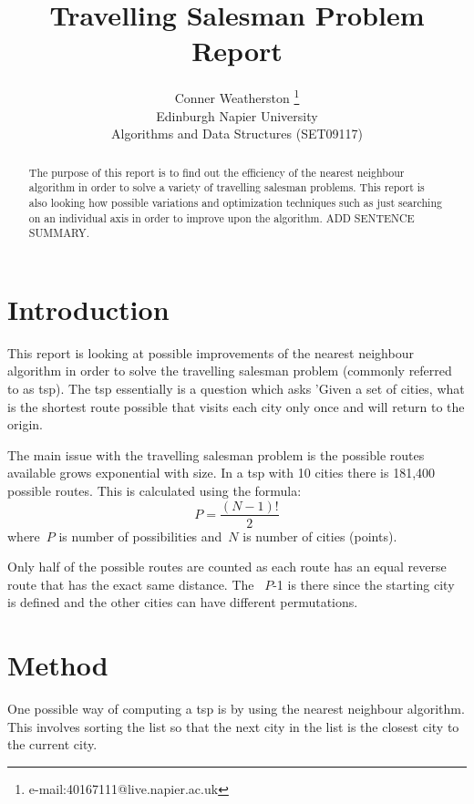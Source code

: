 \documentclass[conference,backref=page]{acmsiggraph}
\title{Travelling Salesman Problem\\
	   Report}
\author{Conner Weatherston \thanks{e-mail:40167111@live.napier.ac.uk} \\
Edinburgh Napier University\\
Algorithms and Data Structures (SET09117)}
\begin{document}
\maketitle

\raggedbottom

\begin{abstract}

The purpose of this report is to find out the efficiency of the nearest neighbour algorithm in order to solve a  variety of travelling salesman problems. This report is also looking how possible variations and optimization techniques such as just searching on an individual axis in order to improve upon the algorithm. ADD SENTENCE SUMMARY. 
\end{abstract}



\keywordlist


\section{Introduction}

This report is looking at possible improvements of the nearest neighbour algorithm in order to solve the travelling salesman problem (commonly referred to as tsp). The tsp essentially is a question which asks 'Given a set of cities, what is the shortest route possible that visits each city only once and will return to the origin\cite{tsp}.

The main issue with the travelling salesman problem is the possible routes available grows exponential with size. In a tsp with 10 cities there is 181,400 possible routes. This is calculated using the formula:
 \begin{equation}
P =  \frac{(N-1)!}{2}
\end{equation}
where~$P$ is number of possibilities and~$N$ is number of cities (points).

Only half of the possible routes are counted as each route has an equal reverse route that has the exact same distance. The ~$P$-1 is there since the starting city is defined and the other cities can have different permutations.

\section{Method}
One possible way of computing a tsp is by using the nearest neighbour algorithm. This involves sorting the list so that the next city in the list is the closest city to the current city. 
\end{document}
